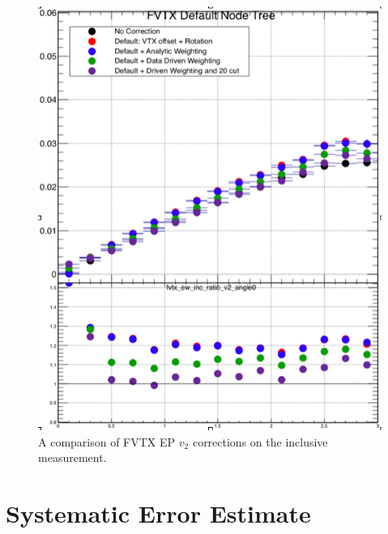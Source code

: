\begin{figure}[!h]
\begin{center}
\includegraphics[width=0.5\linewidth]{figs/fvtx_incl_v2_comparison_corrections.png}
\caption{A comparison of FVTX EP $v_2$ corrections on the inclusive measurement.}
\end{center}
\end{figure}
\section{Systematic Error Estimate}
